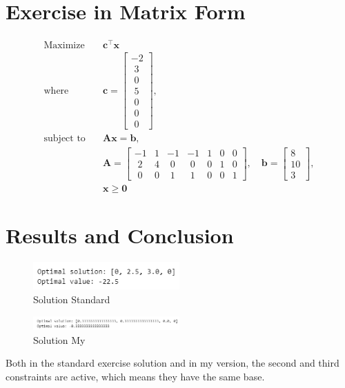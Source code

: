 \documentclass{article}
\begin{document}
\section*{Exercise in Matrix Form}
\[
\begin{aligned}
\text{Maximize} \quad & \mathbf{c}^\top \mathbf{x} \\
\text{where} \quad & \mathbf{c} = 
\begin{bmatrix}
-2 \\
\,\,3 \\
\,\,0 \\
\,\,5 \\
\,\,0 \\
\,\,0 \\
\,\,0 
\end{bmatrix}, \\
\text{subject to} \quad & \mathbf{A} \mathbf{x} = \mathbf{b}, \\
& \mathbf{A} =
\begin{bmatrix}
-1 & 1 & -1 & -1 & 1 & 0 & 0 \\
\,\,2 & 4 & \,\,0 & \,\,0 & 0 & 1 & 0 \\
\,\,0 & 0 & \,\,1 & \,\,1 & 0 & 0 & 1 
\end{bmatrix}, \quad
\mathbf{b} =
\begin{bmatrix}
8 \\
10 \\
3 
\end{bmatrix}, \\
& \mathbf{x} \geq \mathbf{0}
\end{aligned}
\]

\section*{Results and Conclusion}
\begin{figure}[H]
    \centering
    \includegraphics[width=0.5\textwidth]{solution-standard.png}
    \caption{Solution Standard}
    \label{fig:simplex-implementation}
\end{figure}
\begin{figure}[H]
    \centering
    \includegraphics[width=0.5\textwidth]{solution-my.png}
    \caption{Solution My}
    \label{fig:simplex-implementation}
\end{figure}
Both in the standard exercise solution and in my version, the second and third constraints are active, which means they have the same base.
\end{document}
